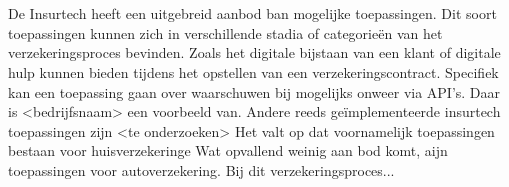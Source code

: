 \section{}
\label{sec:bestaande-toepassingen}

De Insurtech heeft een uitgebreid aanbod ban mogelijke toepassingen. Dit soort toepassingen kunnen zich in verschillende stadia of categorieën van het verzekeringsproces bevinden. Zoals het digitale bijstaan van een klant of digitale hulp kunnen bieden tijdens het opstellen van een verzekeringscontract. Specifiek kan een toepassing gaan over waarschuwen bij mogelijks onweer via API’s. Daar is <bedrijfsnaam> een voorbeeld van. Andere reeds geïmplementeerde insurtech toepassingen zijn <te onderzoeken>
Het valt op dat voornamelijk toepassingen bestaan voor huisverzekeringe
Wat opvallend weinig aan bod komt, aijn toepassingen voor autoverzekering. Bij dit verzekeringsproces...
